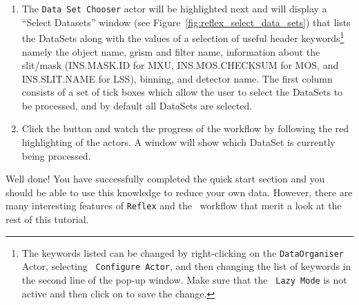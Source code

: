 \begin{enumerate}
  \item The {\tt Data Set Chooser} actor will be highlighted next and
    will display a ``Select Datasets'' window (see
    Figure~\ref{fig:reflex_select_data_sets}) that lists the DataSets
    along with the values of a selection of useful header
    keywords\footnote{The keywords listed can be changed by
      right-clicking on the {\tt DataOrganiser} Actor, selecting {\tt
        Configure Actor}, and then changing the list of keywords in
      the second line of the pop-up window. Make sure that the {\tt
        Lazy Mode} is not active and then click on 
      to save the change.}  namely the object name, grism and filter
    name, information about the slit/mask (INS.MASK.ID for MXU,
    INS.MOS.CHECKSUM for MOS, and INS.SLIT.NAME for LSS), binning, and
    detector name.  The first column consists of a set of tick boxes
    which allow the user to select the DataSets to be processed, and
    by default all DataSets are selected.

  \item Click the  button and watch the progress of
    the workflow by following the red highlighting of the actors. A
    window will show which DataSet is currently being processed.

\end{enumerate}

Well done! You have successfully completed the quick start section and
you should be able to use this knowledge to reduce your own
data. However, there are many interesting features of {\tt Reflex} and
the \instname\, workflow that merit a look at the rest of this tutorial.
